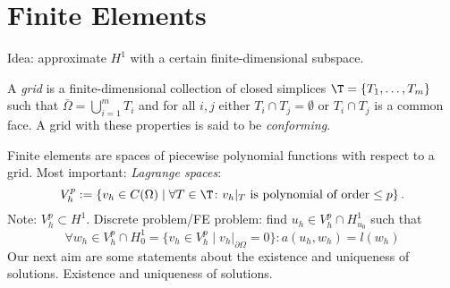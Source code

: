 \section{Finite Elements}
Idea: approximate $H^1$ with a certain finite-dimensional subspace.
\begin{definition}
	A \textit{grid} is a finite-dimensional collection of closed simplices $\T=\{ T_1,\ldots, T_m\}$ such that $\bar{\Omega}=\bigcup_{i=1}^mT_i$ and for all $i,j$ either $T_i\cap T_j=\emptyset$ or $T_i\cap T_j$ is a common face. A grid with these properties is said to be \textit{conforming}.
\end{definition}
Finite elements are spaces of piecewise polynomial functions with respect to a grid. Most important: \textit{Lagrange spaces}: 
\begin{equation*}
	V_h^p:=\left\{ v_h\in C(\Omega)\mid\forall T\in\T\colon v_h|_T\text{ is polynomial of order}\leq p\right\}.
\end{equation*}
Note: $V_h^p\subset H^1$. Discrete problem/FE problem: find $u_h\in V_h^p\cap H^1_{u_0}$ such that 
\begin{equation*}
	\forall w_h\in V_h^p\cap H_0^1=\{ v_h\in V_h^p\mid v_h|_{\partial\Omega}=0\}\colon a(u_h,w_h)=l(w_h)
\end{equation*}
Our next aim are some statements about the existence and uniqueness of solutions.
Existence and uniqueness of solutions.
